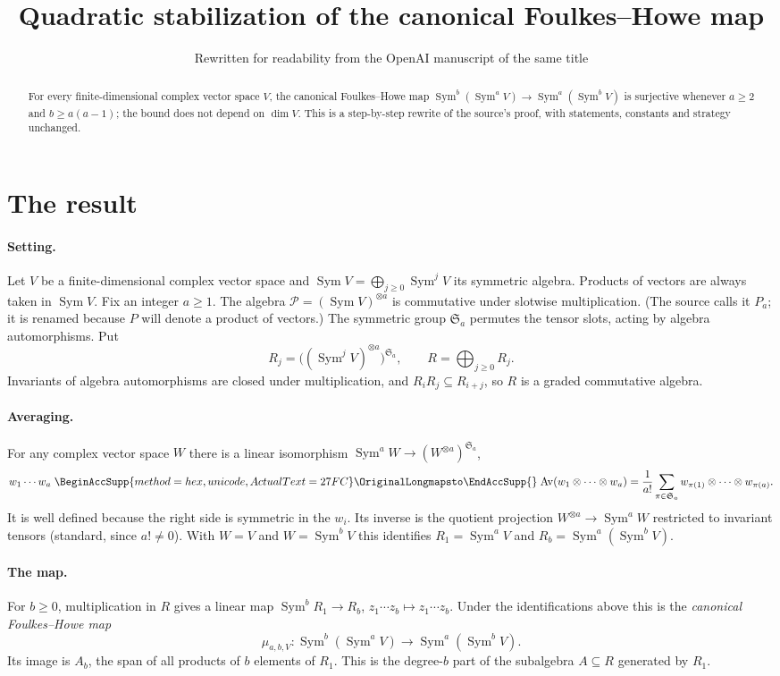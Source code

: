 \documentclass[11pt]{article}
\title{Quadratic stabilization of the canonical Foulkes--Howe map}
\author{Rewritten for readability from the OpenAI manuscript of the same title}
\date{}
\renewcommand{\longmapsto}{\mathrel{
  \BeginAccSupp{method=hex,unicode,ActualText=27FC}
  \OriginalLongmapsto\EndAccSupp{}}}
\theoremstyle{remark}
\DeclareMathOperator{\Sym}{Sym}
\DeclareMathOperator{\Av}{Av}
\newcommand{\Sa}{\mathfrak S_a}
\begin{document}
\maketitle
\begin{abstract}
For every finite-dimensional complex vector space $V$, the canonical
Foulkes--Howe map $\Sym^b(\Sym^a V)\to\Sym^a(\Sym^b V)$ is surjective
whenever $a\ge2$ and $b\ge a(a-1)$; the bound does not depend on $\dim V$.
This is a step-by-step rewrite of the source's proof, with statements,
constants and strategy unchanged.
\end{abstract}

\section{The result}\label{sec:introduction}

\paragraph{Setting.}
Let $V$ be a finite-dimensional complex vector space and
$\Sym V=\bigoplus_{j\ge0}\Sym^jV$ its symmetric algebra. Products of vectors
are always taken in $\Sym V$. Fix an integer $a\ge1$. The algebra
$\mathcal P=(\Sym V)^{\otimes a}$ is commutative under slotwise
multiplication. (The source calls it $P_a$; it is renamed because $P$ will
denote a product of vectors.) The symmetric group $\Sa$ permutes the tensor slots,
acting by algebra automorphisms. Put
\[
 R_j=\bigl((\Sym^j V)^{\otimes a}\bigr)^{\Sa},\qquad R=\bigoplus_{j\ge0}R_j .
\]
Invariants of algebra automorphisms are closed under multiplication, and
$R_iR_j\subseteq R_{i+j}$, so $R$ is a graded commutative algebra.

\paragraph{Averaging.}
For any complex vector space $W$ there is a linear isomorphism
$\Sym^aW\to(W^{\otimes a})^{\Sa}$,
\[
 w_1\cdots w_a\longmapsto
 \Av(w_1\otimes\cdots\otimes w_a)
 =\frac1{a!}\sum_{\pi\in\Sa}w_{\pi(1)}\otimes\cdots\otimes w_{\pi(a)} .
\]
It is well defined because the right side is symmetric in the $w_i$. Its
inverse is the quotient projection $W^{\otimes a}\to\Sym^aW$ restricted to
invariant tensors (standard, since $a!\ne0$). With $W=V$ and $W=\Sym^bV$
this identifies $R_1=\Sym^aV$ and $R_b=\Sym^a(\Sym^bV)$.

\paragraph{The map.}
For $b\ge0$, multiplication in $R$ gives a linear map $\Sym^bR_1\to R_b$,
$z_1\cdots z_b\mapsto z_1\cdots z_b$. Under the identifications above this is
the \emph{canonical Foulkes--Howe map}
\begin{equation}\label{eq:map}
 \mu_{a,b,V}:\Sym^b(\Sym^a V)\longrightarrow\Sym^a(\Sym^b V).
\end{equation}
Its image is $A_b$, the span of all products of $b$ elements of $R_1$. This
is the degree-$b$ part of the subalgebra $A\subseteq R$ generated by $R_1$.
\end{document}
